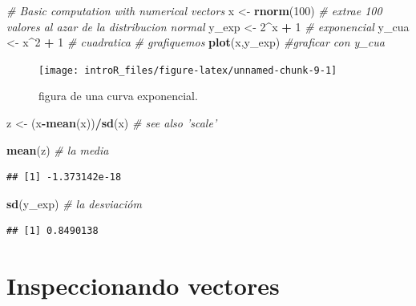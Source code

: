 \documentclass[
]{book}
\newenvironment{Shaded}{\begin{snugshade}}{\end{snugshade}}
\newcommand{\CommentTok}[1]{\textcolor[rgb]{0.56,0.35,0.01}{\textit{#1}}}
\newcommand{\DecValTok}[1]{\textcolor[rgb]{0.00,0.00,0.81}{#1}}
\newcommand{\KeywordTok}[1]{\textcolor[rgb]{0.13,0.29,0.53}{\textbf{#1}}}
\newcommand{\NormalTok}[1]{#1}
\newcommand{\OperatorTok}[1]{\textcolor[rgb]{0.81,0.36,0.00}{\textbf{#1}}}
\newcommand{\StringTok}[1]{\textcolor[rgb]{0.31,0.60,0.02}{#1}}
\begin{document}
\begin{Shaded}
\begin{Highlighting}[]
\CommentTok{# Basic computation with numerical vectors}
\NormalTok{x <-}\StringTok{ }\KeywordTok{rnorm}\NormalTok{(}\DecValTok{100}\NormalTok{) }\CommentTok{# extrae 100 valores al azar de la distribucion normal}
\NormalTok{y_exp <-}\StringTok{ }\DecValTok{2}\OperatorTok{^}\NormalTok{x }\OperatorTok{+}\StringTok{ }\DecValTok{1} \CommentTok{# exponencial}
\NormalTok{y_cua <-}\StringTok{ }\NormalTok{x}\OperatorTok{^}\DecValTok{2} \OperatorTok{+}\StringTok{ }\DecValTok{1} \CommentTok{# cuadratica}
\CommentTok{# grafiquemos}
\KeywordTok{plot}\NormalTok{(x,y_exp) }\CommentTok{#graficar con y_cua}
\end{Highlighting}
\end{Shaded}

\begin{figure}

{\centering \texttt{[image: introR\_files/figure-latex/unnamed-chunk-9-1]} 

}

\caption{figura de una curva exponencial.}\label{fig:unnamed-chunk-9}
\end{figure}

\begin{Shaded}
\begin{Highlighting}[]
\NormalTok{z <-}\StringTok{ }\NormalTok{(x}\OperatorTok{-}\KeywordTok{mean}\NormalTok{(x))}\OperatorTok{/}\KeywordTok{sd}\NormalTok{(x)  }\CommentTok{# see also 'scale'}

\KeywordTok{mean}\NormalTok{(z) }\CommentTok{# la media}
\end{Highlighting}
\end{Shaded}

\begin{verbatim}
## [1] -1.373142e-18
\end{verbatim}

\begin{Shaded}
\begin{Highlighting}[]
\KeywordTok{sd}\NormalTok{(y_exp) }\CommentTok{# la desviacióm}
\end{Highlighting}
\end{Shaded}

\begin{verbatim}
## [1] 0.8490138
\end{verbatim}

\hypertarget{inspeccionando-vectores}{%
\section{Inspeccionando vectores}\label{inspeccionando-vectores}}
\end{document}
